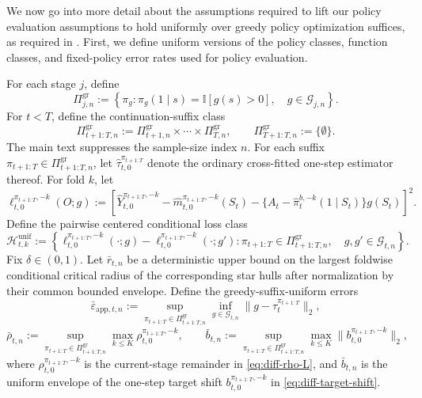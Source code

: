 \documentclass[opre,nonblindrev]{informs4}
\providecommand{\cG}{\mathcal G}
\newcommand{\norm}[1]{\lVert#1\rVert}
\newcommand{\blipadv}{\tau}
\begin{document}
We now go into more detail about the assumptions required to lift our policy evaluation assumptions to hold uniformly over greedy policy optimization suffices, as required in . First, we define uniform versions of the policy classes, function classes, and fixed-policy error rates used for policy evaluation.

For each stage $j$, define
\[
\Pi_{j,n}^{\mathrm{gr}}
:=
\left\{
\pi_g:
\pi_g(1\mid s)=\mathbb I[g(s)>0],
\quad g\in\cG_{j,n}
\right\}.
\]
For $t<T$, define the continuation-suffix class
\[
\Pi_{t+1:T,n}^{\mathrm{gr}}
:=
\Pi_{t+1,n}^{\mathrm{gr}}\times\cdots\times
\Pi_{T,n}^{\mathrm{gr}},
\qquad
\Pi_{T+1:T,n}^{\mathrm{gr}}:=\{\emptyset\}.
\]
The main text suppresses the sample-size index $n$. For each suffix
$\pi_{t+1:T}\in\Pi_{t+1:T,n}^{\mathrm{gr}}$, let
$\hat\blipadv_{t,0}^{\pi_{t+1:T}}$ denote the ordinary cross-fitted
one-step estimator thereof. For fold $k$, let
\[
\ell_{t,0}^{\pi_{t+1:T},-k}(O;g)
:=
\left[
\hat Y_{t,0}^{\pi_{t+1:T},-k}
-\hat m_{t,0}^{\pi_{t+1:T},-k}(S_t)
-\{A_t-\hat\pi_t^{b,-k}(1\mid S_t)\}g(S_t)
\right]^2.
\]
Define the pairwise centered conditional loss class
\[
\mathcal H_{t,k}^{\mathrm{unif}}
:=
\left\{
\ell_{t,0}^{\pi_{t+1:T},-k}(\mathord\cdot;g)
-\ell_{t,0}^{\pi_{t+1:T},-k}
(\mathord\cdot;g'):
\pi_{t+1:T}\in\Pi_{t+1:T,n}^{\mathrm{gr}},
\quad g,g'\in\cG_{t,n}
\right\}.
\]
Fix $\delta\in(0,1)$. Let $\bar r_{t,n}$ be a
deterministic upper bound on the largest foldwise conditional critical radius
of the corresponding star hulls after normalization by their common bounded
envelope. Define the greedy-suffix-uniform errors
\[
\bar\varepsilon_{\mathrm{app},t,n}
:=
\sup_{\pi_{t+1:T}\in\Pi_{t+1:T,n}^{\mathrm{gr}}}
\inf_{g\in\cG_{t,n}}
\norm{g-\blipadv_t^{\pi_{t+1:T}}}_2,
\]
\[
\bar\rho_{t,n}
:=
\sup_{\pi_{t+1:T}\in\Pi_{t+1:T,n}^{\mathrm{gr}}}
\max_{k\leq K}\rho_{t,0}^{\pi_{t+1:T},-k},
\qquad
\bar b_{t,n}
:=
\sup_{\pi_{t+1:T}\in\Pi_{t+1:T,n}^{\mathrm{gr}}}
\max_{k\leq K}\norm{b_{t,0}^{\pi_{t+1:T},-k}}_2,
\]
where $\rho_{t,0}^{\pi_{t+1:T},-k}$ is the current-stage remainder in
\cref{eq:diff-rho-L}, and $\bar b_{t,n}$ is the uniform envelope of the
one-step target shift $b_{t,0}^{\pi_{t+1:T},-k}$ in
\cref{eq:diff-target-shift}.
\end{document}
